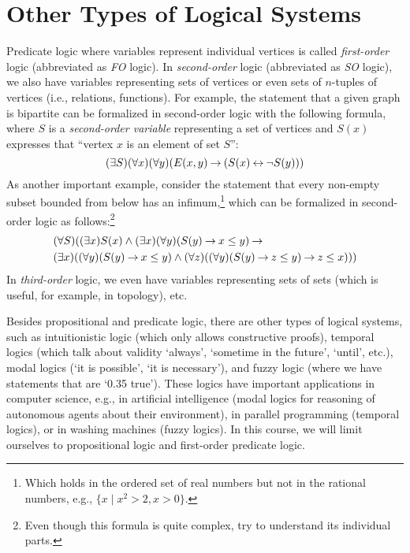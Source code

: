 \section{Other Types of Logical Systems}

Predicate logic where variables represent individual vertices is called \emph{first-order} logic (abbreviated as \emph{FO} logic). In \emph{second-order} logic (abbreviated as \emph{SO} logic), we also have variables representing sets of vertices or even sets of \(n\)-tuples of vertices (i.e., relations, functions). For example, the statement that a given graph is bipartite can be formalized in second-order logic with the following formula, where $S$ is a \emph{second-order variable} representing a set of vertices and $S(x)$ expresses that ``vertex $x$ is an element of set $S$'':
$$
(\exists S)(\forall x)(\forall y)(E(x, y) \mathbin{\rightarrow} (S(x) \mathbin{\leftrightarrow} \neg S(y)))
$$
As another important example, consider the statement that every non-empty subset bounded from below has an infimum,\footnote{Which holds in the ordered set of real numbers but not in the rational numbers, e.g., \( \{x \mid x^2 > 2, x > 0\} \).} which can be formalized in second-order logic as follows:\footnote{Even though this formula is quite complex, try to understand its individual parts.}
\begin{align*}
&(\forall S)((\exists x)S(x) \land (\exists x)(\forall y)(S(y) \mathbin{\rightarrow} x \leq y) \mathbin{\rightarrow} {}\\ 
&(\exists x)((\forall y)(S(y) \mathbin{\rightarrow} x \leq y) \land (\forall z)((\forall y)(S(y) \mathbin{\rightarrow} z \leq y) \mathbin{\rightarrow} z \leq x)))
\end{align*}
In \emph{third-order} logic, we even have variables representing sets of sets (which is useful, for example, in topology), etc.

Besides propositional and predicate logic, there are other types of logical systems, such as intuitionistic logic (which only allows constructive proofs), temporal logics (which talk about validity `always', `sometime in the future', `until', etc.), modal logics (`it is possible', `it is necessary'), and fuzzy logic (where we have statements that are `0.35 true'). These logics have important applications in computer science, e.g., in artificial intelligence (modal logics for reasoning of autonomous agents about their environment), in parallel programming (temporal logics), or in washing machines (fuzzy logics). In this course, we will limit ourselves to propositional logic and first-order predicate logic.


